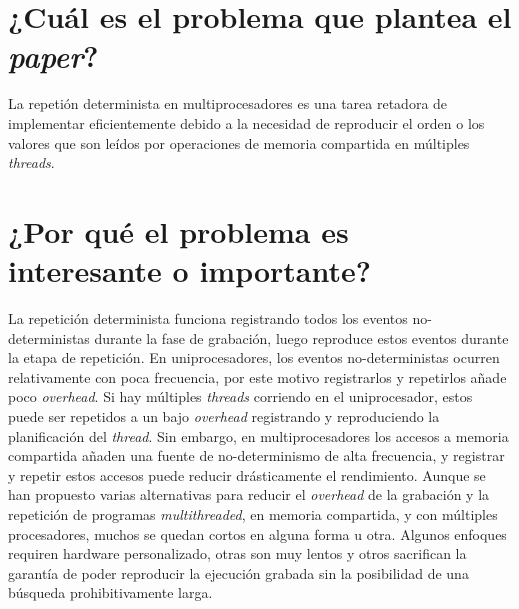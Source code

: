 \section{¿Cuál es el problema que plantea el \textit{paper}?}
La repetión determinista en multiprocesadores es una tarea retadora de implementar eficientemente debido a la necesidad de reproducir el orden o los valores que son leídos por operaciones de memoria compartida en múltiples \emph{threads}.

\section{¿Por qué el problema es interesante o importante?}
La repetición determinista funciona registrando todos los eventos no-deterministas durante la fase de grabación, luego reproduce estos eventos durante la etapa de repetición. En uniprocesadores, los eventos no-deterministas ocurren relativamente con poca frecuencia, por este motivo registrarlos y repetirlos añade poco \emph{overhead}. Si hay múltiples \emph{threads} corriendo en el uniprocesador, estos puede ser repetidos a un bajo \emph{overhead} registrando y reproduciendo la planificación del \emph{thread}. Sin embargo, en multiprocesadores los accesos a memoria compartida añaden una fuente de no-determinismo de alta frecuencia, y registrar y repetir estos accesos puede reducir drásticamente el rendimiento. Aunque se han propuesto varias alternativas para reducir el \emph{overhead} de la grabación y la repetición de programas \emph{multithreaded}, en memoria compartida, y con múltiples procesadores, muchos se quedan cortos en alguna forma u otra. Algunos enfoques requiren hardware personalizado, otras son muy lentos y otros sacrifican la garantía de poder reproducir la ejecución grabada sin la posibilidad de una búsqueda prohibitivamente larga. 

